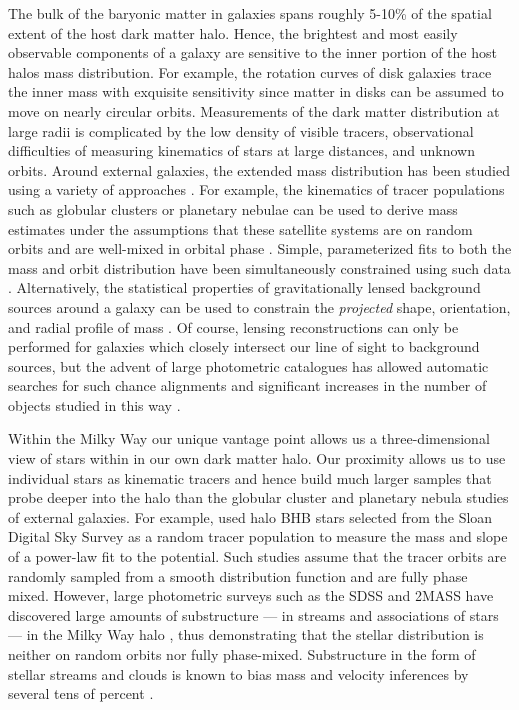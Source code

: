 \documentclass[letterpaper,12pt,preprint]{aastex}
\begin{document}
The bulk of the baryonic matter in galaxies spans roughly 5-10\% of the spatial extent of the host dark matter halo. Hence, the brightest and most easily observable components of a galaxy are sensitive to the inner portion of the host halos mass distribution. For example, the rotation curves of disk galaxies trace the inner mass with exquisite sensitivity since matter in disks can be assumed to move on nearly circular orbits. Measurements of the dark matter distribution at large radii is complicated by the low density of visible tracers, observational difficulties of measuring kinematics of stars at large distances, and unknown orbits. Around external galaxies, the extended mass distribution has been studied using a variety of approaches \citep[see][for a a complete and detailed review]{courteau13}. For example, the kinematics of tracer populations such as globular clusters or planetary nebulae can be used to derive mass estimates under the assumptions that these satellite systems are on random orbits and are well-mixed in orbital phase \citep[early investigations include][]{mendez01,cote03}. Simple, parameterized fits to both the mass and orbit distribution have been simultaneously constrained using such data \citep[e.g.][]{napolitano11,deason12c}. Alternatively, the statistical properties of gravitationally lensed background sources around a galaxy can be used to constrain the \emph{projected} shape, orientation, and radial profile of mass \citep[see, for example, the Lens Structure and Dynamics Survey described in][]{koopmans02}. Of course, lensing reconstructions can only be performed for galaxies which closely intersect our line of sight to background sources, but the advent of large photometric catalogues has allowed automatic searches for such chance alignments and significant increases in the number of objects studied in this way \citep[e.g. the Sloan Lens ACS Survey, see][]{bolton06}.

Within the Milky Way our unique vantage point allows us a three-dimensional view of stars within in our own dark matter halo. Our proximity allows us to use individual stars as kinematic tracers and hence build much larger samples that probe deeper into the halo than the globular cluster and planetary nebula studies of external galaxies. For example, \cite{deason12a} used halo BHB stars selected from the Sloan Digital Sky Survey \cite[SDSS;][]{york00} as a random tracer population to measure the mass and slope of a power-law fit to the potential. Such studies assume that the tracer orbits are randomly sampled from a smooth distribution function and are fully phase mixed. However, large photometric surveys such as the SDSS and 2MASS \citep{skrutskie06} have discovered large amounts of substructure --- in streams and associations of stars --- in the Milky Way halo \citep[e.g.,][]{belokurov06, rochapinto04}, thus demonstrating that the stellar distribution is neither on random orbits nor fully phase-mixed. Substructure in the form of stellar streams and clouds is known to bias mass and velocity inferences by several tens of percent \citep{yencho06}.
\end{document}
